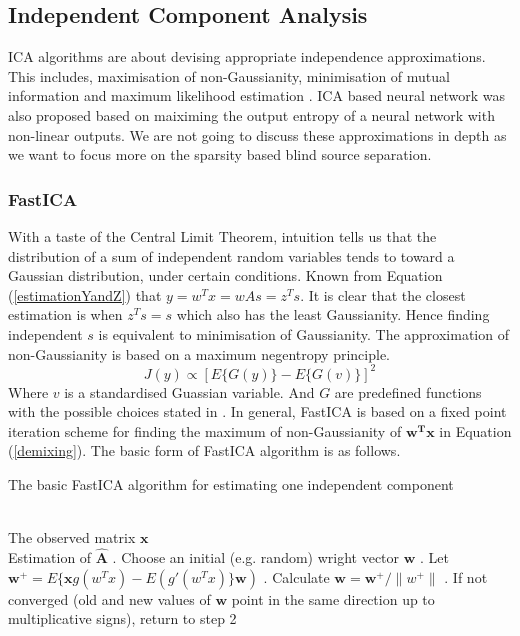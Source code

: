 \subsection{Independent Component Analysis}
ICA algorithms are about devising appropriate independence approximations. This includes, maximisation of non-Gaussianity, minimisation of mutual information and maximum likelihood estimation \cite{HYVARINEN2000411}. ICA based neural network \cite{Bell1995AnIA} was also proposed based on maiximing the output entropy of a neural network with non-linear outputs. We are not going to discuss these approximations in depth as we want to focus more on the sparsity based blind source separation. 
\subsubsection{FastICA}
With a taste of the Central Limit Theorem, intuition tells us that the distribution of a sum of independent random variables tends to toward a Gaussian distribution, under certain conditions. Known from Equation (\ref{estimationYandZ}) that $y = w^T x = w A s = z^T s$. It is clear that the closest estimation is when $z^Ts = s$ which also has the least Gaussianity. Hence finding independent $s$ is equivalent to minimisation of Gaussianity. The approximation of non-Gaussianity is based on a maximum negentropy principle.
\begin{equation}
    J(y) \propto [E\{G(y)\} - E\{G(v)\}]^2
\end{equation}
Where $v$ is a standardised Guassian variable. And $G$ are predefined functions with the possible choices stated in \cite{HYVARINEN2000411}. In general, FastICA is based on a fixed point iteration scheme for finding the maximum of non-Gaussianity of $\mathbf{w^T x}$ in Equation (\ref{demixing}). The basic form of FastICA algorithm is as follows.
\begin{algorithm}[H] 
\caption{ The basic FastICA algorithm for estimating one independent component}
\label{alg:Framwork} 
\begin{algorithmic}
\REQUIRE ~~\\%
The observed matrix $\mathbf{x}$
\ENSURE ~~\\ %
Estimation of $\hat{\mathbf{A}}$
. Choose an initial (e.g. random) wright vector $\mathbf{w}$
. Let $\mathbf{w}^+ = E\{\mathbf{x}g(w^T x) - E(g'(w^Tx)\}\mathbf{w})$
. Calculate $\mathbf{w} = \mathbf{w}^{+}/\lVert w^{+}\rVert$
. If not converged (old and new values of $\mathbf{w}$ point in the same direction up to multiplicative signs), return to step 2
\end{algorithmic}
\end{algorithm}
